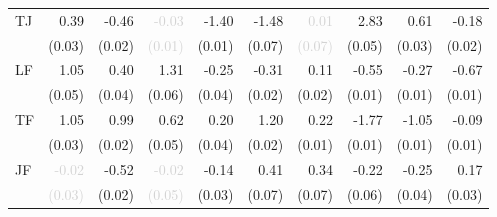 \begin{tabular}{lrrrrrrrrr}
\multirow{2}{*}{TJ} &0.39 &-0.46 &\textcolor{LightGray}{-0.03} &-1.40 &-1.48 &\cellcolor{Gray}\textcolor{LightGray}{0.01} &2.83 &0.61 &-0.18\\
 &\tiny{(0.03)} &\tiny{(0.02)} &\textcolor{LightGray}{\tiny{(0.01)}} &\tiny{(0.01)} &\tiny{(0.07)} &\cellcolor{Gray}\textcolor{LightGray}{\tiny{(0.07)}} &\tiny{(0.05)} &\tiny{(0.03)} &\tiny{(0.02)}\\[1ex]
\multirow{2}{*}{LF} &1.05 &0.40 &1.31 &-0.25 &-0.31 &0.11 &\cellcolor{Gray}-0.55 &-0.27 &-0.67\\
 &\tiny{(0.05)} &\tiny{(0.04)} &\tiny{(0.06)} &\tiny{(0.04)} &\tiny{(0.02)} &\tiny{(0.02)} &\cellcolor{Gray}\tiny{(0.01)} &\tiny{(0.01)} &\tiny{(0.01)}\\[1ex]
\multirow{2}{*}{TF} &1.05 &0.99 &0.62 &0.20 &1.20 &0.22 &-1.77 &\cellcolor{Gray}-1.05 &-0.09\\
 &\tiny{(0.03)} &\tiny{(0.02)} &\tiny{(0.05)} &\tiny{(0.04)} &\tiny{(0.02)} &\tiny{(0.01)} &\tiny{(0.01)} &\cellcolor{Gray}\tiny{(0.01)} &\tiny{(0.01)}\\[1ex]
\multirow{2}{*}{JF} &\textcolor{LightGray}{-0.02} &-0.52 &\textcolor{LightGray}{-0.02} &-0.14 &0.41 &0.34 &-0.22 &-0.25 &\cellcolor{Gray}0.17\\
 &\textcolor{LightGray}{\tiny{(0.03)}} &\tiny{(0.02)} &\textcolor{LightGray}{\tiny{(0.05)}} &\tiny{(0.03)} &\tiny{(0.07)} &\tiny{(0.07)} &\tiny{(0.06)} &\tiny{(0.04)} &\cellcolor{Gray}\tiny{(0.03)}\\[1ex]
\bottomrule
\end{tabular}
